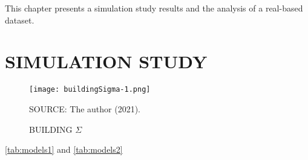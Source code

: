 This chapter presents a simulation study results and the analysis of a
real-based dataset.

\section{SIMULATION STUDY}
\label{cap:simures}

\begin{figure}[H]
 \setlength{\abovecaptionskip}{.0001pt}
 \caption{BUILDING \(\Sigma\)}
 \vspace{0.2cm}\centering
 \texttt{[image: buildingSigma-1.png]}\\
 \begin{footnotesize}
  SOURCE: The author (2021).
 \end{footnotesize}
 \label{fig:buildingSigma}
\end{figure}

\autoref{tab:models1} and \autoref{tab:models2}

